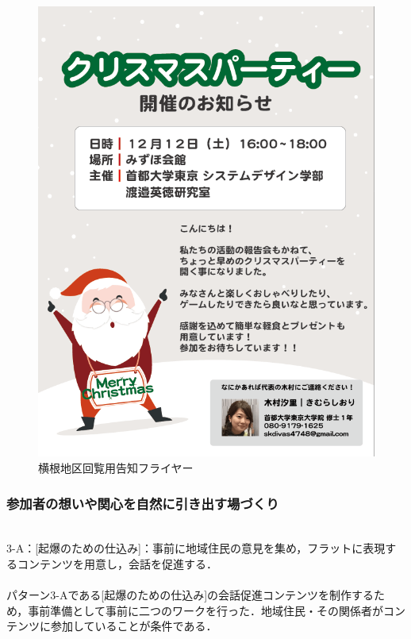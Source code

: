 \documentclass[a4paper]{jsarticle}
\begin{document}
\begin{figure}[H]
  \begin{center}
    \includegraphics[width=0.8\hsize]{./images/05.png}
    \caption{横根地区回覧用告知フライヤー}
    \label{chirstmas2}
  \end{center}
\end{figure}

\subsubsection{参加者の想いや関心を自然に引き出す場づくり}\\
3-A：[起爆のための仕込み]：事前に地域住民の意見を集め，フラットに表現するコンテンツを用意し，会話を促進する．\\\\
パターン3-Aである[起爆のための仕込み]の会話促進コンテンツを制作するため，事前準備として事前に二つのワークを行った．地域住民・その関係者がコンテンツに参加していることが条件である．\\\\
\end{document}
